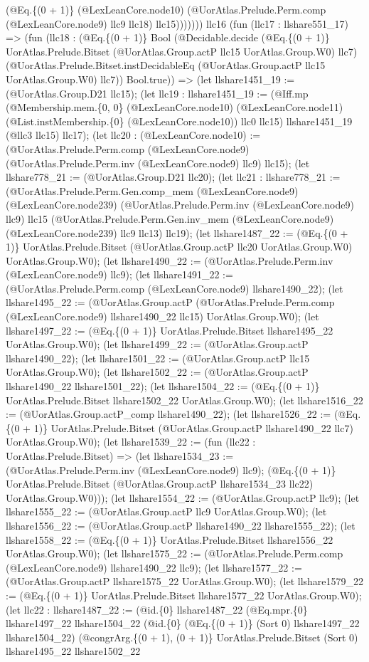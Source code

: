 \documentclass[11pt]{article}
\begin{document}
(@Eq.\{(0 + 1)\} (@LexLeanCore.node10) (@UorAtlas.Prelude.Perm.comp (@LexLeanCore.node9) llc9 llc18) llc15))))))) llc16 (fun (llc17 : llshare551\_17) => (fun (llc18 : (@Eq.\{(0 + 1)\} Bool (@Decidable.decide (@Eq.\{(0 + 1)\} UorAtlas.Prelude.Bitset (@UorAtlas.Group.actP llc15 UorAtlas.Group.W0) llc7) (@UorAtlas.Prelude.Bitset.instDecidableEq (@UorAtlas.Group.actP llc15 UorAtlas.Group.W0) llc7)) Bool.true)) => (let llshare1451\_19 := (@UorAtlas.Group.D21 llc15); (let llc19 : llshare1451\_19 := (@Iff.mp (@Membership.mem.\{0, 0\} (@LexLeanCore.node10) (@LexLeanCore.node11) (@List.instMembership.\{0\} (@LexLeanCore.node10)) llc0 llc15) llshare1451\_19 (@llc3 llc15) llc17); (let llc20 : (@LexLeanCore.node10) := (@UorAtlas.Prelude.Perm.comp (@LexLeanCore.node9) (@UorAtlas.Prelude.Perm.inv (@LexLeanCore.node9) llc9) llc15); (let llshare778\_21 := (@UorAtlas.Group.D21 llc20); (let llc21 : llshare778\_21 := (@UorAtlas.Prelude.Perm.Gen.comp\_mem (@LexLeanCore.node9) (@LexLeanCore.node239) (@UorAtlas.Prelude.Perm.inv (@LexLeanCore.node9) llc9) llc15 (@UorAtlas.Prelude.Perm.Gen.inv\_mem (@LexLeanCore.node9) (@LexLeanCore.node239) llc9 llc13) llc19); (let llshare1487\_22 := (@Eq.\{(0 + 1)\} UorAtlas.Prelude.Bitset (@UorAtlas.Group.actP llc20 UorAtlas.Group.W0) UorAtlas.Group.W0); (let llshare1490\_22 := (@UorAtlas.Prelude.Perm.inv (@LexLeanCore.node9) llc9); (let llshare1491\_22 := (@UorAtlas.Prelude.Perm.comp (@LexLeanCore.node9) llshare1490\_22); (let llshare1495\_22 := (@UorAtlas.Group.actP (@UorAtlas.Prelude.Perm.comp (@LexLeanCore.node9) llshare1490\_22 llc15) UorAtlas.Group.W0); (let llshare1497\_22 := (@Eq.\{(0 + 1)\} UorAtlas.Prelude.Bitset llshare1495\_22 UorAtlas.Group.W0); (let llshare1499\_22 := (@UorAtlas.Group.actP llshare1490\_22); (let llshare1501\_22 := (@UorAtlas.Group.actP llc15 UorAtlas.Group.W0); (let llshare1502\_22 := (@UorAtlas.Group.actP llshare1490\_22 llshare1501\_22); (let llshare1504\_22 := (@Eq.\{(0 + 1)\} UorAtlas.Prelude.Bitset llshare1502\_22 UorAtlas.Group.W0); (let llshare1516\_22 := (@UorAtlas.Group.actP\_comp llshare1490\_22); (let llshare1526\_22 := (@Eq.\{(0 + 1)\} UorAtlas.Prelude.Bitset (@UorAtlas.Group.actP llshare1490\_22 llc7) UorAtlas.Group.W0); (let llshare1539\_22 := (fun (llc22 : UorAtlas.Prelude.Bitset) => (let llshare1534\_23 := (@UorAtlas.Prelude.Perm.inv (@LexLeanCore.node9) llc9); (@Eq.\{(0 + 1)\} UorAtlas.Prelude.Bitset (@UorAtlas.Group.actP llshare1534\_23 llc22) UorAtlas.Group.W0))); (let llshare1554\_22 := (@UorAtlas.Group.actP llc9); (let llshare1555\_22 := (@UorAtlas.Group.actP llc9 UorAtlas.Group.W0); (let llshare1556\_22 := (@UorAtlas.Group.actP llshare1490\_22 llshare1555\_22); (let llshare1558\_22 := (@Eq.\{(0 + 1)\} UorAtlas.Prelude.Bitset llshare1556\_22 UorAtlas.Group.W0); (let llshare1575\_22 := (@UorAtlas.Prelude.Perm.comp (@LexLeanCore.node9) llshare1490\_22 llc9); (let llshare1577\_22 := (@UorAtlas.Group.actP llshare1575\_22 UorAtlas.Group.W0); (let llshare1579\_22 := (@Eq.\{(0 + 1)\} UorAtlas.Prelude.Bitset llshare1577\_22 UorAtlas.Group.W0); (let llc22 : llshare1487\_22 := (@id.\{0\} llshare1487\_22 (@Eq.mpr.\{0\} llshare1497\_22 llshare1504\_22 (@id.\{0\} (@Eq.\{(0 + 1)\} (Sort 0) llshare1497\_22 llshare1504\_22) (@congrArg.\{(0 + 1), (0 + 1)\} UorAtlas.Prelude.Bitset (Sort 0) llshare1495\_22 llshare1502\_22 
\end{document}
